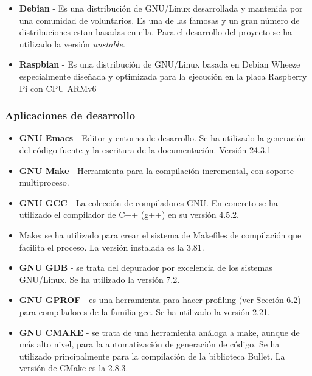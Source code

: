 \begin{itemize}
\item \textbf{Debian} - Es una distribución de GNU/Linux desarrollada y mantenida por una comunidad de voluntarios. Es una de las famosas y un gran número de distribuciones estan basadas en ella. Para el desarrollo del proyecto se ha utilizado la versión \emph{unstable}. 

\item \textbf{Raspbian} - Es una distribución de GNU/Linux basada en Debian Wheeze especialmente diseñada y optimizada para la ejecución en la placa Raspberry Pi con  CPU ARMv6   
\end{itemize}

\subsubsection{Aplicaciones de desarrollo}
\begin{itemize}
\item \textbf{GNU Emacs} - Editor y entorno de desarrollo. Se ha utilizado la generación del código fuente y la escritura de la documentación. Versión 24.3.1
\item \textbf{GNU Make} - Herramienta para la compilación incremental, con soporte multiproceso.
\item \textbf{GNU GCC} - La colección de compiladores GNU. En concreto se ha utilizado el compilador de C++ (g++) en su versión 4.5.2.
\item Make: se ha utilizado para crear el sistema de Makefiles de compilación que facilita el proceso. La versión instalada es la 3.81.
\item \textbf{GNU GDB} - se trata del depurador por excelencia de los sistemas GNU/Linux. Se ha utilizado la versión 7.2.
\item \textbf{GNU GPROF} - es una herramienta para hacer profiling (ver Sección 6.2) para compiladores de la familia gcc. Se ha utilizado la versión 2.21.
\item \textbf{GNU CMAKE} - se trata de una herramienta análoga a make, aunque de más alto nivel, para la automatización de generación de código. Se ha utilizado principalmente para la compilación de la biblioteca Bullet. La versión de CMake es la 2.8.3. 
\end{itemize}

